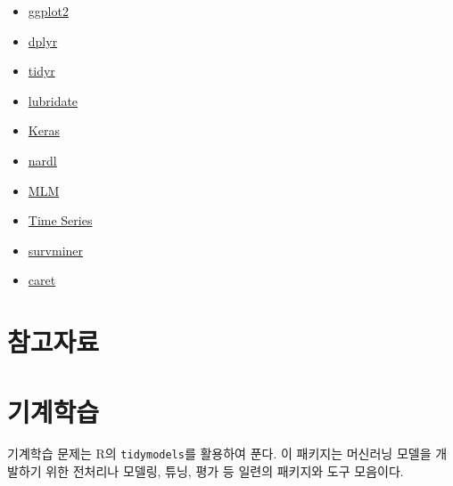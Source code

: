\documentclass[
  letterpaper,
  DIV=11,
  numbers=noendperiod]{scrreprt}
\providecommand{\tightlist}{%
  \setlength{\itemsep}{0pt}\setlength{\parskip}{0pt}}\usepackage{longtable,booktabs,array}
\begin{document}
\begin{itemize}
\tightlist
\item
  \href{https://posit.co/wp-content/uploads/2022/10/data-visualization-1.pdf}{ggplot2}
\item
  \href{https://posit.co/wp-content/uploads/2022/10/data-transformation-1.pdf}{dplyr}
\item
  \href{https://posit.co/wp-content/uploads/2022/10/tidyr.pdf}{tidyr}
\item
  \href{https://posit.co/wp-content/uploads/2022/10/lubridate-1.pdf}{lubridate}
\item
  \href{https://posit.co/resources/cheatsheets/?type=posit-cheatsheets\&_page=1/}{Keras}
\item
  \href{https://posit.co/wp-content/uploads/2022/10/nardl.pdf}{nardl}
\item
  \href{https://posit.co/wp-content/uploads/2022/10/Machine-Learning-Modelling-in-R.pdf}{MLM}
\item
  \href{https://posit.co/wp-content/uploads/2022/10/time-series.pdf}{Time
  Series}
\item
  \href{https://posit.co/wp-content/uploads/2022/10/survminer.pdf}{survminer}
\item
  \href{https://posit.co/wp-content/uploads/2022/10/caret.pdf}{caret}
\end{itemize}

\hypertarget{uxcc38uxace0uxc790uxb8cc}{%
\chapter*{참고자료}\label{uxcc38uxace0uxc790uxb8cc}}


\hypertarget{uxae30uxacc4uxd559uxc2b5}{%
\chapter*{기계학습}\label{uxae30uxacc4uxd559uxc2b5}}


기계학습 문제는 R의 \texttt{tidymodels}를 활용하여 푼다. 이 패키지는
머신러닝 모델을 개발하기 위한 전처리나 모델링, 튜닝, 평가 등 일련의
패키지와 도구 모음이다.
\end{document}
